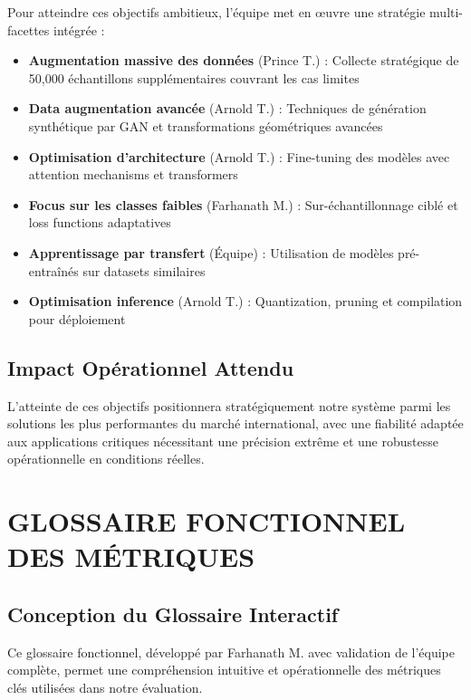 \documentclass[letterpaper, 10 pt, conference]{ieeeconf}
\begin{document}
Pour atteindre ces objectifs ambitieux, l'équipe met en œuvre une stratégie multi-facettes intégrée :

\begin{itemize}
\item \textbf{Augmentation massive des données} (Prince T.) : Collecte stratégique de 50,000 échantillons supplémentaires couvrant les cas limites
\item \textbf{Data augmentation avancée} (Arnold T.) : Techniques de génération synthétique par GAN et transformations géométriques avancées
\item \textbf{Optimisation d'architecture} (Arnold T.) : Fine-tuning des modèles avec attention mechanisms et transformers
\item \textbf{Focus sur les classes faibles} (Farhanath M.) : Sur-échantillonnage ciblé et loss functions adaptatives
\item \textbf{Apprentissage par transfert} (Équipe) : Utilisation de modèles pré-entraînés sur datasets similaires
\item \textbf{Optimisation inference} (Arnold T.) : Quantization, pruning et compilation pour déploiement
\end{itemize}

\subsection{Impact Opérationnel Attendu}

L'atteinte de ces objectifs positionnera stratégiquement notre système parmi les solutions les plus performantes du marché international, avec une fiabilité adaptée aux applications critiques nécessitant une précision extrême et une robustesse opérationnelle en conditions réelles.

\section{GLOSSAIRE FONCTIONNEL DES MÉTRIQUES}

\subsection{Conception du Glossaire Interactif}

Ce glossaire fonctionnel, développé par Farhanath M. avec validation de l'équipe complète, permet une compréhension intuitive et opérationnelle des métriques clés utilisées dans notre évaluation.
\end{document}
